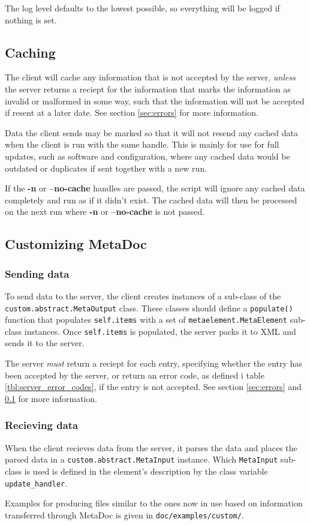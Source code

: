 The log level defaults to the lowest possible, so everything will be logged if
nothing is set.

\subsection{Caching}
\label{sec:caching}
The client will cache any information that is not accepted by the server, 
\textit{unless} the server returns a reciept for the information that marks the 
information as invalid or malformed in some way, such that the information will 
not be accepted if resent at a later date. See section \ref{sec:errors} for
more information.

Data the client sends may be marked so that it will not resend any cached data
when the client is run with the same handle. This is mainly for use for full
updates, such as software and configuration, where any cached data would be
outdated or duplicates if sent together with a new run.

If the \textbf{-n} or \textbf{--no-cache} handles are passed, the script will
ignore any cached data completely and run as if it didn't exist. The cached
data will then be processed on the next run where \textbf{-n} or
\textbf{--no-cache} is not passed.

\subsection{Customizing MetaDoc}
\label{sec:customizing_client}

\subsubsection{Sending data}
To send data to the server, the client creates instances of a sub-class of the
\\
\texttt{custom.abstract.MetaOutput} class. These classes should define a
\texttt{populate()} function that populates \texttt{self.items} with a set of
\texttt{metaelement.MetaElement} sub-class instances. Once \texttt{self.items}
is populated, the server packs it to XML and sends it to the server.

The server \textit{must} return a reciept for each entry, specifying whether
the entry has been accepted by the server, or return an error code, as defined
i table \ref{tbl:server_error_codes}, if the entry is not accepted. See
section \ref{sec:errors} and \ref{sec:caching} for more information.

\subsubsection{Recieving data}
When the client recieves data from the server, it parses the data and places
the parsed data in a \texttt{custom.abstract.MetaInput} instance. Which
\texttt{MetaInput} sub-class is used is defined in the element's description by
the class variable \texttt{update\_handler}.

Examples for producing files similar to the ones now in use based on
information transferred through MetaDoc is given in
\texttt{doc/examples/custom/}.

